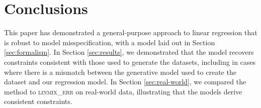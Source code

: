 \documentclass[fleqn,usenatbib]{mnras}
\begin{document}




\section{Conclusions}
\label{sec:conclusion}

This paper has demonstrated a general-purpose approach to linear regression that
is robust to model misspecification, with a model laid out in Section
\ref{sec:formalism}. In Section \ref{sec:results}, we demonstrated that the
model recovers constraints consistent with those used to generate the datasets,
including in cases where there is a mismatch between the generative model used
to create the dataset and our regression model. In Section \ref{sec:real-world},
we compared the method to \textsc{linmix\_err} \citep{Kelly:2007} on real-world
data, illustrating that the models derive consistent constraints.
\end{document}
